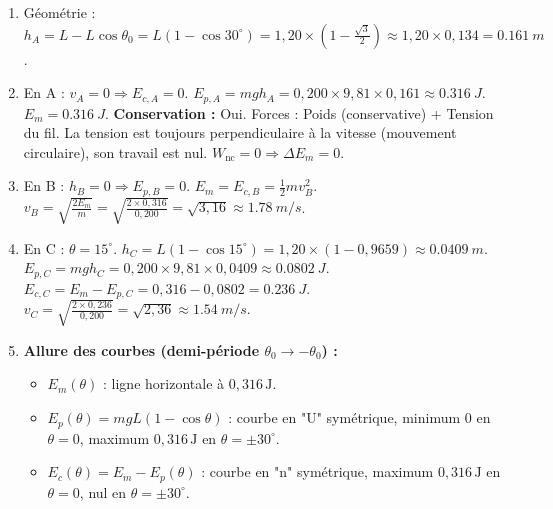 \documentclass[11pt]{article}
\begin{document}
\begin{corrige}
\begin{enumerate}
    \item Géométrie : $h_A = L - L\cos\theta_0 = L(1 - \cos 30^\circ) = 1,20 \times (1 - \frac{\sqrt{3}}{2}) \approx 1,20 \times 0,134 = \SI{0,161}{m}$.
    \item En A : $v_A=0 \Rightarrow E_{c,A}=0$. $E_{p,A} = mgh_A = 0,200 \times 9,81 \times 0,161 \approx \SI{0,316}{J}$.
    $E_m = \SI{0,316}{J}$.
    \textbf{Conservation :} Oui. Forces : Poids (conservative) + Tension du fil. La tension est toujours perpendiculaire à la vitesse (mouvement circulaire), son travail est nul. $W_{\text{nc}}=0 \Rightarrow \Delta E_m=0$.
    \item En B : $h_B=0 \Rightarrow E_{p,B}=0$. $E_m = E_{c,B} = \frac{1}{2}mv_B^2$.
    $v_B = \sqrt{\frac{2E_m}{m}} = \sqrt{\frac{2 \times 0,316}{0,200}} = \sqrt{3,16} \approx \SI{1,78}{m/s}$.
    \item En C : $\theta = 15^\circ$. $h_C = L(1 - \cos 15^\circ) = 1,20 \times (1 - 0,9659) \approx \SI{0,0409}{m}$.
    $E_{p,C} = mgh_C = 0,200 \times 9,81 \times 0,0409 \approx \SI{0,0802}{J}$.
    $E_{c,C} = E_m - E_{p,C} = 0,316 - 0,0802 = \SI{0,236}{J}$.
    $v_C = \sqrt{\frac{2 \times 0,236}{0,200}} = \sqrt{2,36} \approx \SI{1,54}{m/s}$.
    \item \textbf{Allure des courbes (demi-période $\theta_0 \to -\theta_0$) :}
    \begin{itemize}
        \item $E_m(\theta)$ : ligne horizontale à $0,316\,\text{J}$.
        \item $E_p(\theta) = mgL(1-\cos\theta)$ : courbe en "U" symétrique, minimum $0$ en $\theta=0$, maximum $0,316\,\text{J}$ en $\theta=\pm 30^\circ$.
        \item $E_c(\theta) = E_m - E_p(\theta)$ : courbe en "n" symétrique, maximum $0,316\,\text{J}$ en $\theta=0$, nul en $\theta=\pm 30^\circ$.
    \end{itemize}
\end{enumerate}
\end{corrige}
\end{document}
